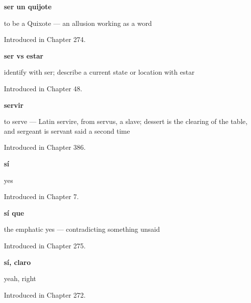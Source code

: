 \noindent\begin{minipage}[t]{\linewidth}
\raggedright
\textbf{ser un quijote}\par
\small to be a Quixote — an allusion working as a word\par
\footnotesize Introduced in Chapter 274.
\end{minipage}\par\medskip

\noindent\begin{minipage}[t]{\linewidth}
\raggedright
\textbf{ser vs estar}\par
\small identify with ser; describe a current state or location with estar\par
\footnotesize Introduced in Chapter 48.
\end{minipage}\par\medskip

\noindent\begin{minipage}[t]{\linewidth}
\raggedright
\textbf{servir}\par
\small to serve — Latin servire, from servus, a slave; dessert is the clearing of the table, and sergeant is servant said a second time\par
\footnotesize Introduced in Chapter 386.
\end{minipage}\par\medskip

\noindent\begin{minipage}[t]{\linewidth}
\raggedright
\textbf{sí}\par
\small yes\par
\footnotesize Introduced in Chapter 7.
\end{minipage}\par\medskip

\noindent\begin{minipage}[t]{\linewidth}
\raggedright
\textbf{sí que}\par
\small the emphatic yes — contradicting something unsaid\par
\footnotesize Introduced in Chapter 275.
\end{minipage}\par\medskip

\noindent\begin{minipage}[t]{\linewidth}
\raggedright
\textbf{sí, claro}\par
\small yeah, right\par
\footnotesize Introduced in Chapter 272.
\end{minipage}\par\medskip

